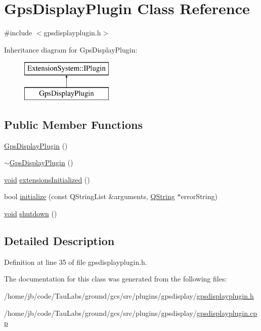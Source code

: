 \hypertarget{class_gps_display_plugin}{\section{\-Gps\-Display\-Plugin \-Class \-Reference}
\label{class_gps_display_plugin}
}


{\ttfamily \#include $<$gpsdisplayplugin.\-h$>$}

\-Inheritance diagram for \-Gps\-Display\-Plugin\-:\begin{figure}[H]
\begin{center}
\leavevmode
\includegraphics[height=2.000000cm]{class_gps_display_plugin}
\end{center}
\end{figure}
\subsection*{\-Public \-Member \-Functions}
\begin{DoxyCompactItemize}
\item 
\hyperlink{group___g_p_s_gadget_plugin_ga48d06ebeae3e8a6acb71c7a3c1e8c6c0}{\-Gps\-Display\-Plugin} ()
\item 
\hyperlink{group___g_p_s_gadget_plugin_gaa42f8ee4562f96fdd5e4c384bf7ca1d6}{$\sim$\-Gps\-Display\-Plugin} ()
\item 
\hyperlink{group___u_a_v_objects_plugin_ga444cf2ff3f0ecbe028adce838d373f5c}{void} \hyperlink{group___g_p_s_gadget_plugin_gad0d01fd7addd024c1a5fad7002a7c358}{extensions\-Initialized} ()
\item 
bool \hyperlink{group___g_p_s_gadget_plugin_ga481b9c74a2e46d2e461d472ac2e10c8f}{initialize} (const \-Q\-String\-List \&arguments, \hyperlink{group___u_a_v_objects_plugin_gab9d252f49c333c94a72f97ce3105a32d}{\-Q\-String} $\ast$error\-String)
\item 
\hyperlink{group___u_a_v_objects_plugin_ga444cf2ff3f0ecbe028adce838d373f5c}{void} \hyperlink{group___g_p_s_gadget_plugin_ga239f5aa443093c518b27a04e23d20b2e}{shutdown} ()
\end{DoxyCompactItemize}


\subsection{\-Detailed \-Description}


\-Definition at line 35 of file gpsdisplayplugin.\-h.



\-The documentation for this class was generated from the following files\-:\begin{DoxyCompactItemize}
\item 
/home/jb/code/\-Tau\-Labs/ground/gcs/src/plugins/gpsdisplay/\hyperlink{gpsdisplayplugin_8h}{gpsdisplayplugin.\-h}\item 
/home/jb/code/\-Tau\-Labs/ground/gcs/src/plugins/gpsdisplay/\hyperlink{gpsdisplayplugin_8cpp}{gpsdisplayplugin.\-cpp}\end{DoxyCompactItemize}

